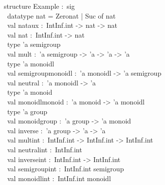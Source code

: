 \begin{isabellebody}
\isamarkuptrue%
%
\isadelimquote
%
\endisadelimquote
%
\isatagquote
%
\begin{isamarkuptext}%
\isatypewriter%
\noindent%
\hspace*{0pt}structure Example :~sig\\
\hspace*{0pt} ~datatype nat = Zero{}nat | Suc of nat\\
\hspace*{0pt} ~val nat{}aux :~IntInf.int -> nat -> nat\\
\hspace*{0pt} ~val nat :~IntInf.int -> nat\\
\hspace*{0pt} ~type 'a semigroup\\
\hspace*{0pt} ~val mult :~'a semigroup -> 'a -> 'a -> 'a\\
\hspace*{0pt} ~type 'a monoidl\\
\hspace*{0pt} ~val semigroup{}monoidl :~'a monoidl -> 'a semigroup\\
\hspace*{0pt} ~val neutral :~'a monoidl -> 'a\\
\hspace*{0pt} ~type 'a monoid\\
\hspace*{0pt} ~val monoidl{}monoid :~'a monoid -> 'a monoidl\\
\hspace*{0pt} ~type 'a group\\
\hspace*{0pt} ~val monoid{}group :~'a group -> 'a monoid\\
\hspace*{0pt} ~val inverse :~'a group -> 'a -> 'a\\
\hspace*{0pt} ~val mult{}int :~IntInf.int -> IntInf.int -> IntInf.int\\
\hspace*{0pt} ~val neutral{}int :~IntInf.int\\
\hspace*{0pt} ~val inverse{}int :~IntInf.int -> IntInf.int\\
\hspace*{0pt} ~val semigroup{}int :~IntInf.int semigroup\\
\hspace*{0pt} ~val monoidl{}int :~IntInf.int monoidl\\

\end{isamarkuptext}
\end{isabellebody}
